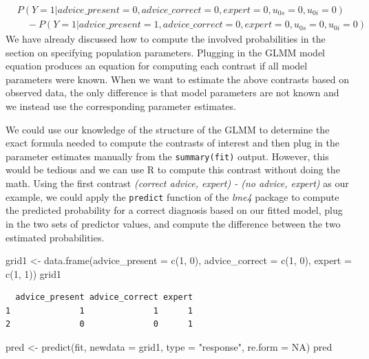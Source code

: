 \documentclass[
  man,
  floatsintext,
  longtable,
  a4paper,
  nolmodern,
  notxfonts,
  notimes,
  colorlinks=true,linkcolor=blue,citecolor=blue,urlcolor=blue]{apa7}
\newenvironment{Shaded}{\begin{snugshade}}{\end{snugshade}}
\newcommand{\AttributeTok}[1]{\textcolor[rgb]{0.40,0.45,0.13}{#1}}
\newcommand{\ConstantTok}[1]{\textcolor[rgb]{0.56,0.35,0.01}{#1}}
\newcommand{\DecValTok}[1]{\textcolor[rgb]{0.68,0.00,0.00}{#1}}
\newcommand{\FunctionTok}[1]{\textcolor[rgb]{0.28,0.35,0.67}{#1}}
\newcommand{\NormalTok}[1]{\textcolor[rgb]{0.00,0.23,0.31}{#1}}
\newcommand{\OtherTok}[1]{\textcolor[rgb]{0.00,0.23,0.31}{#1}}
\newcommand{\StringTok}[1]{\textcolor[rgb]{0.13,0.47,0.30}{#1}}
\begin{document}
\[
\begin{aligned}
& P(Y=1|advice\_present = 0, advice\_correct = 0, expert = 0, u_{0s} = 0, u_{0i} = 0) \\
& \quad - P(Y=1|advice\_present = 1, advice\_correct = 0, expert = 0, u_{0s} = 0, u_{0i} = 0)
\end{aligned}
\] We have already discussed how to compute the involved probabilities
in the section on specifying population parameters. Plugging in the GLMM
model equation produces an equation for computing each contrast if all
model parameters were known. When we want to estimate the above
contrasts based on observed data, the only difference is that model
parameters are not known and we instead use the corresponding parameter
estimates.

We could use our knowledge of the structure of the GLMM to determine the
exact formula needed to compute the contrasts of interest and then plug
in the parameter estimates manually from the \texttt{summary(fit)}
output. However, this would be tedious and we can use R to compute this
contrast without doing the math. Using the first contrast \emph{(correct
advice, expert) - (no advice, expert)} as our example, we could apply
the \texttt{predict} function of the \emph{lme4} package to compute the
predicted probability for a correct diagnosis based on our fitted model,
plug in the two sets of predictor values, and compute the difference
between the two estimated probabilities.

\begin{Shaded}
\begin{Highlighting}[]
\NormalTok{grid1 }\OtherTok{\textless{}{-}} \FunctionTok{data.frame}\NormalTok{(}\AttributeTok{advice\_present =} \FunctionTok{c}\NormalTok{(}\DecValTok{1}\NormalTok{, }\DecValTok{0}\NormalTok{), }\AttributeTok{advice\_correct =} \FunctionTok{c}\NormalTok{(}\DecValTok{1}\NormalTok{, }\DecValTok{0}\NormalTok{), }
  \AttributeTok{expert =} \FunctionTok{c}\NormalTok{(}\DecValTok{1}\NormalTok{, }\DecValTok{1}\NormalTok{))}
\NormalTok{grid1}
\end{Highlighting}
\end{Shaded}

\begin{verbatim}
  advice_present advice_correct expert
1              1              1      1
2              0              0      1
\end{verbatim}

\begin{Shaded}
\begin{Highlighting}[]
\NormalTok{pred }\OtherTok{\textless{}{-}} \FunctionTok{predict}\NormalTok{(fit, }\AttributeTok{newdata =}\NormalTok{ grid1, }\AttributeTok{type =} \StringTok{"response"}\NormalTok{, }\AttributeTok{re.form =} \ConstantTok{NA}\NormalTok{)}
\NormalTok{pred}
\end{Highlighting}
\end{Shaded}
\end{document}

